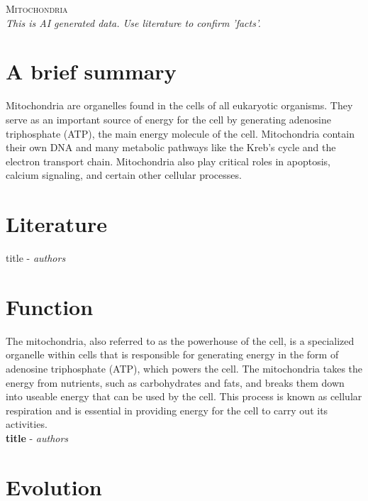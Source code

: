 \documentclass{article}
\begin{document}
\vspace*{-10pt}
\begin{center}
	{\Huge \scshape {Mitochondria}}\\
    \textit{This is AI generated data. Use literature to confirm 'facts'.}\\
\end{center}


\section{A brief summary}


Mitochondria are organelles found in the cells of all eukaryotic organisms. They serve as an important source of energy for the cell by generating adenosine triphosphate (ATP), the main energy molecule of the cell. Mitochondria contain their own DNA and many metabolic pathways like the Kreb’s cycle and the electron transport chain. Mitochondria also play critical roles in apoptosis, calcium signaling, and certain other cellular processes.\\
\vspace{1mm}

\section{Literature}
title - \textit{authors}\\
\vspace{1mm}

    \section{Function}
    

The mitochondria, also referred to as the powerhouse of the cell, is a specialized organelle within cells that is responsible for generating energy in the form of adenosine triphosphate (ATP), which powers the cell. The mitochondria takes the energy from nutrients, such as carbohydrates and fats, and breaks them down into useable energy that can be used by the cell. This process is known as cellular respiration and is essential in providing energy for the cell to carry out its activities.\\
    \vspace{3mm}
        \textbf{title} - \textit{authors}\\
    \section{Evolution}
    
\end{document}

